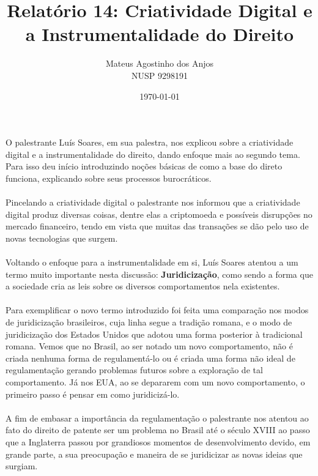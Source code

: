 \documentclass[12pt]{article}
\title{Relatório 14: Criatividade Digital e a Instrumentalidade do Direito}
\author{Mateus Agostinho dos Anjos\\NUSP 9298191}
\date{\today}
\begin{document}
	\maketitle
	\paragraph{}
		O palestrante Luís Soares, em sua palestra, nos explicou sobre a 
		criatividade digital e a instrumentalidade do direito, dando enfoque mais
		ao segundo tema. Para isso deu início introduzindo noções básicas de como
		a base do direto funciona, explicando sobre seus processos burocráticos.
	\paragraph{}
		Pincelando a criatividade digital o palestrante nos informou que a
		criatividade digital produz diversas coisas, dentre elas a criptomoeda
		e possíveis disrupções no mercado financeiro, tendo em vista que muitas
		das transações se dão pelo uso de novas tecnologias que surgem.
	\paragraph{}
		Voltando o enfoque para a instrumentalidade em si,  Luís Soares atentou
		a um termo muito importante nesta discussão: \textbf{Juridicização},
		como sendo a forma que a sociedade cria as leis sobre os diversos 
		comportamentos nela existentes.
	\paragraph{}
		Para exemplificar o novo termo introduzido foi feita uma comparação
		nos modos de juridicização brasileiros, cuja linha segue a tradição romana,
		e o modo de juridicização dos Estados Unidos que adotou uma forma
		posterior à tradicional romana. Vemos que no Brasil, ao ser notado um
		novo comportamento, não é criada nenhuma forma de regulamentá-lo ou
		é criada uma forma não ideal de regulamentação 	gerando problemas 
		futuros sobre a exploração de tal comportamento. Já nos EUA, ao
		se depararem com um novo comportamento, o primeiro passo é pensar
		em como juridicizá-lo.
	\paragraph{}
		A fim de embasar a importância da regulamentação o palestrante nos
		atentou ao fato do direito de patente ser um problema no Brasil
		até o século XVIII ao passo que a Inglaterra passou por grandiosos
		momentos de desenvolvimento devido, em grande parte, a sua 
		preocupação e maneira de se juridicizar as novas ideias que surgiam.
\end{document}
